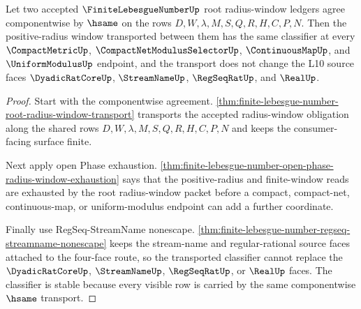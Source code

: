 \begin{theorem}
\label{thm:finite-lebesgue-number-radius-classifier-stability}
Let two accepted $\FiniteLebesgueNumberUp$ root radius-window ledgers agree componentwise by $\hsame$ on the rows $D,W,\lambda,M,S,Q,R,H,C,P,N$. Then the positive-radius window transported between them has the same classifier at every $\CompactMetricUp$, $\CompactNetModulusSelectorUp$, $\ContinuousMapUp$, and $\UniformModulusUp$ endpoint, and the transport does not change the L10 source faces $\DyadicRatCoreUp$, $\StreamNameUp$, $\RegSeqRatUp$, and $\RealUp$.
\end{theorem}
\begin{proof}
Start with the componentwise agreement. \autoref{thm:finite-lebesgue-number-root-radius-window-transport} transports the accepted radius-window obligation along the shared rows $D,W,\lambda,M,S,Q,R,H,C,P,N$ and keeps the consumer-facing surface finite.

Next apply open Phase exhaustion. \autoref{thm:finite-lebesgue-number-open-phase-radius-window-exhaustion} says that the positive-radius and finite-window reads are exhausted by the root radius-window packet before a compact, compact-net, continuous-map, or uniform-modulus endpoint can add a further coordinate.

Finally use RegSeq-StreamName nonescape. \autoref{thm:finite-lebesgue-number-regseq-streamname-nonescape} keeps the stream-name and regular-rational source faces attached to the four-face route, so the transported classifier cannot replace the $\DyadicRatCoreUp$, $\StreamNameUp$, $\RegSeqRatUp$, or $\RealUp$ faces. The classifier is stable because every visible row is carried by the same componentwise $\hsame$ transport.
\end{proof}

